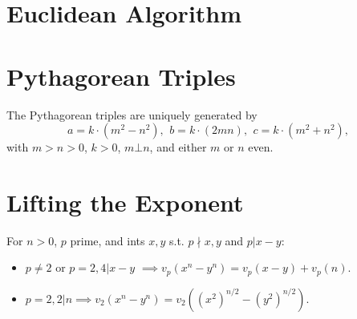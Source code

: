 
\section{Euclidean Algorithm}

\begin{comment}
	\subsection{Bézout's identity}
	For $a \neq $, $b \neq 0$, then $d=\gcd(a,b)$ is the smallest positive integer for which there are integer solutions to
	$$ax+by=d$$
	If $(x,y)$ is one solution, then all solutions are given by
	$$\left(x+\frac{kb}{\gcd(a,b)}, y-\frac{ka}{\gcd(a,b)}\right), \quad k\in\mathbb{Z}$$
\end{comment}

	
\section{Pythagorean Triples}
	 The Pythagorean triples are uniquely generated by
	 \[ a=k\cdot (m^{2}-n^{2}),\ \,b=k\cdot (2mn),\ \,c=k\cdot (m^{2}+n^{2}), \]
	 with $m > n > 0$, $k > 0$, $m \bot n$, and either $m$ or $n$ even.

\section{Lifting the Exponent}

For $n>0$, $p$ prime, and ints $x,y$ s.t. $p\nmid x,y$ and $p|x-y$:


\begin{itemize}
\item $p\neq 2$ or $p=2, 4|x-y$ $\implies v_p(x^n - y^n) = v_p(x - y) + v_p(n)$.
\item $p=2, 2|n \implies v_2(x^n-y^n)=v_2((x^2)^{n/2}-(y^2)^{n/2})$.
\end{itemize}
